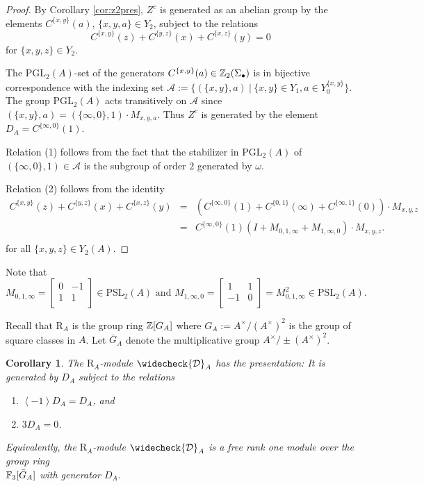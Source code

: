 \documentclass[12pt]{amsart}
\newtheorem{cor}[lem]{Corollary}
\theoremstyle{definition}
\newcommand{\F}[1]{\Bbb{F}_{#1}}
\newcommand{\Z}{\Bbb{Z}}
\newcommand{\pspl}[2]{\mathrm{PSL}_{#1}(#2)}
\newcommand{\pgl}[2]{\mathrm{PGL}_{#1}(#2)}
\newcommand{\cconst}[1]{D_{#1}}
\newcommand{\ccconstmod}[1]{\widecheck{\mathcal{D}}_{#1}}
\newcommand{\<}{\langle}
\renewcommand{\>}{\rangle}
\newcommand{\sqcl}[1]{G_{#1}}%
\newcommand{\psqcl}[1]{\bar{G}_{#1}}%
\newcommand{\sgr}[1]{\mathrm{R}_{#1}}%
\newcommand{\an}[1]{\left\langle{#1}\right\rangle}
\begin{document}
\begin{proof}   By Corollary \ref{cor:z2pres}, $Z^c$ is generated as an abelian group by the elements $C^{\{ x,y\}}(a)$, $\{ x,y,a\}\in Y_2$, subject to the relations 
\[
C^{\{ x,y\}}(z)+C^{\{ y,z\}}(x)+C^{\{ x,z\}}(y)=0
\]
for $\{ x,y,z\}\in Y_2$.

The $\pgl{2}{A}$-set of the generators $C^{\{ x,y\}}(a)\in \Z_2(\Sigma_\bullet)$ is in bijective correspondence with the indexing set 
$\mathcal{A}:=\{ (\{ x,y\},a)\ |\  \{ x,y\}\in Y_1, a\in Y^{\{ x,y\}}_0\}$. The group $\pgl{2}{A}$ acts transitively on $\mathcal{A}$  since $(\{ x,y\},a)=(\{ \infty,0\},1)\cdot M_{x,y,a}$.
Thus $Z^c$ is generated by the element $\cconst{A}=C^{\{ \infty,0\}}(1)$. 

Relation (1) follows from the fact that the stabilizer in $\pgl{2}{A}$ of $(\{ \infty,0\},1)\in \mathcal{A}$ is the subgroup of order $2$ generated by $\omega$. 

Relation (2) follows from the identity
\begin{eqnarray*}
C^{\{ x,y\}}(z)+C^{\{ y,z\}}(x)+C^{\{ x,z\}}(y)&=&\left( C^{\{ \infty,0\}}(1)+C^{\{ 0,1\}}(\infty)+C^{\{ \infty,1\}}(0)\right)\cdot M_{x,y,z}\\
&=&C^{\{ \infty,0\}}(1)\left( I+M_{0,1,\infty}+M_{1,\infty,0}\right)\cdot M_{x,y,z}.\\
\end{eqnarray*}
for all $\{ x,y,z\}\in Y_2(A)$.
\end{proof}

Note that 
\[
M_{0,1,\infty}= \left[
\begin{array}{cc}
0&-1\\
1&1\\
\end{array}
\right]\in\pspl{2}{A}\mbox{ and } M_{1,\infty,0}=
\left[
\begin{array}{cc}
1&1\\
-1&0\\
\end{array}
\right]=M_{0,1,\infty}^2\in\pspl{2}{A}.
\]


Recall that $\sgr{A}$ is the group ring $\Z[\sqcl{A}]$ where $\sqcl{A}:=A^\times/(A^\times)^2$ is the group of square classes in $A$. 
Let $\psqcl{A}$ denote the multiplicative group $A^\times/\pm(A^\times)^2$.

\begin{cor}\label{cor:zcpres}  The $\sgr{A}$-module $\ccconstmod{A}$ has the presentation: It is generated by $\cconst{A}$ subject to the relations
\begin{enumerate}
\item $\an{-1}\cconst{A}=\cconst{A}$, and
\item $3\cconst{A}=0$.
\end{enumerate}
Equivalently, the $\sgr{A}$-module $\ccconstmod{A}$ is a free rank one module over the group ring\\
 $\F{3}[\psqcl{A}]$ with generator $\cconst{A}$. 
\end{cor}
\end{document}

